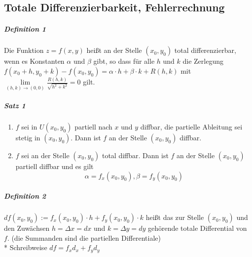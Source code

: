 \documentclass[a4paper]{scrartcl}
\begin{document}
\subsection{Totale Differenzierbarkeit, Fehlerrechnung}
\subparagraph{Definition 1} Die Funktion $z=f(x,y)$ heißt an der Stelle $(x_0,y_0)$ total differenzierbar, wenn es Konstanten $\alpha$ und $\beta$ gibt, so dass für alle $h$ und $k$ die Zerlegung $f(x_0 + h, y_0 + k) - f(x_0,y_0) = \alpha \cdot h + \beta \cdot k + R(h,k)$ mit $\lim\limits_{(h,k) \to (0,0)} \frac{R(h,k)}{\sqrt{h^2+k^2}} = 0$ gilt.

\subparagraph{Satz 1}
\begin{enumerate}
\item $f$ sei in $U(x_0,y_0)$ partiell nach $x$ und $y$ diffbar, die partielle Ableitung sei stetig in $(x_0,y_0)$. Dann ist $f$ an der Stelle $(x_0,y_0) $ diffbar.
\item $f$ sei an der Stelle $(x_0,y_0)$ total diffbar. Dann ist $f$ an der Stelle $(x_0,y_0)$ partiell diffbar und es gilt
\[\alpha = f_x(x_0,y_0) , \beta  = f_y(x_0,y_0)\]
\end{enumerate}

\subparagraph{Definition 2} $df(x_0,y_0) := f_x(x_0,y_0) \cdot h + f_y(x_0,y_0) \cdot k$ heißt das zur Stelle $(x_0,y_0)$ und den Zuwächsen $h= \Delta x =dx$ und $k = \Delta y = dy$ gehörende totale Differential von $f$. (die Summanden sind die partiellen Differentiale)\\*
Schreibweise $df= f_x d_x + f_y d_y$
\end{document}
